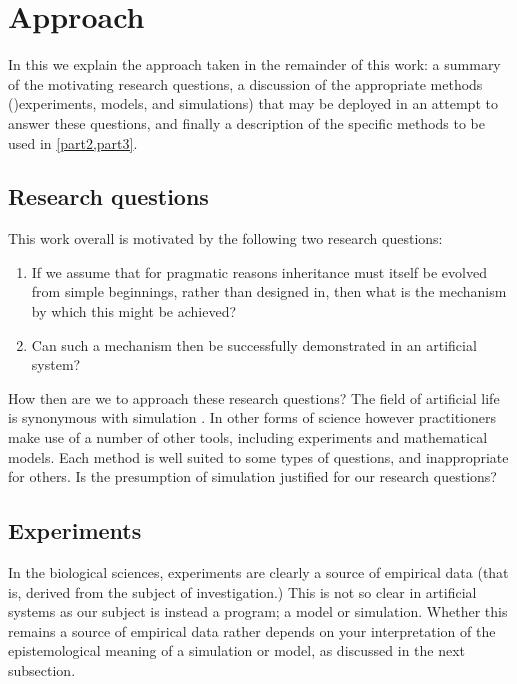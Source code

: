 \chapter{Approach}\label{methods}

In this  we explain the approach taken in the remainder of this work: a summary of the motivating research questions, a discussion of the appropriate methods ()experiments, models, and simulations) that may be deployed in an attempt to answer these questions, and finally a description of the specific methods to be used in \cref{part2,part3}.

\section{Research questions}\label{research-questions}

This work overall is motivated by the following two research questions:

\begin{enumerate}[label=RQ\arabic*:]
	\item If we assume that for pragmatic reasons inheritance must itself be evolved from simple beginnings, rather than designed in, then what is the mechanism by which this might be achieved?
	\item Can such a mechanism then be successfully demonstrated in an artificial system?
\end{enumerate}

How then are we to approach these research questions? The field of artificial life is synonymous with simulation \parencite[chap.2]{Aicardi2010}. In other forms of science however practitioners make use of a number of other tools, including experiments and mathematical models. Each method is well suited to some types of questions, and inappropriate for others. Is the presumption of simulation justified for our research questions?

\section{Experiments}\label{experiments}

In the biological sciences, experiments are clearly a source of empirical data (that is, derived from the subject of investigation.) This is not so clear in artificial systems as our subject is instead a program; a model or simulation. Whether this remains a source of empirical data rather depends on your interpretation of the epistemological meaning of a simulation or model, as discussed in the next subsection.

